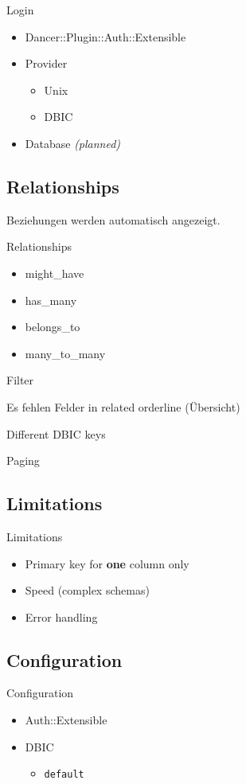\begin{frame}{Login}
\begin{itemize}
\item Dancer::Plugin::Auth::Extensible
\item Provider
\begin{itemize}
\item Unix
\item DBIC
\end{itemize}
\item Database \textit{(planned)}
\end{itemize}
\end{frame}

\subsection{Relationships}

Beziehungen werden automatisch angezeigt.

\begin{frame}{Relationships}
\begin{itemize}
\item might\_have
\item has\_many
\item belongs\_to
\item many\_to\_many
\end{itemize}
\end{frame}

Filter

Es fehlen Felder in related orderline (Übersicht)

Different DBIC keys

Paging

\subsection{Limitations}
\begin{frame}{Limitations}
\begin{itemize}
\item Primary key for \textbf{one} column only
\item Speed (complex schemas)
\item Error handling
\end{itemize}
\end{frame}

\subsection{Configuration}
\begin{frame}[fragile]{Configuration}
\begin{itemize}
\item Auth::Extensible
\item DBIC
\begin{itemize}
\item \verb|default|
\end{itemize}
\end{itemize}
\end{frame}

